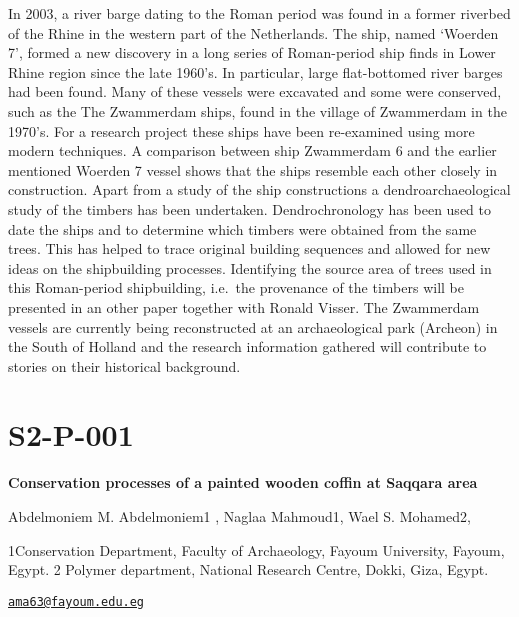 \documentclass[
]{book}
\begin{document}
In 2003, a river barge dating to the Roman period was found in a former riverbed of the Rhine in the western part of the Netherlands. The ship, named `Woerden 7', formed a new discovery in a long series of Roman-period ship finds in Lower Rhine region since the late 1960's. In particular, large flat-bottomed river barges had been found. Many of these vessels were excavated and some were conserved, such as the The Zwammerdam ships, found in the village of Zwammerdam in the 1970's. For a research project these ships have been re-examined using more modern techniques. A comparison between ship Zwammerdam 6 and the earlier mentioned Woerden 7 vessel shows that the ships resemble each other closely in construction. Apart from a study of the ship constructions a dendroarchaeological study of the timbers has been undertaken. Dendrochronology has been used to date the ships and to determine which timbers were obtained from the same trees. This has helped to trace original building sequences and allowed for new ideas on the shipbuilding processes. Identifying the source area of trees used in this Roman-period shipbuilding, i.e.~the provenance of the timbers will be presented in an other paper together with Ronald Visser. The Zwammerdam vessels are currently being reconstructed at an archaeological park (Archeon) in the South of Holland and the research information gathered will contribute to stories on their historical background.

\hypertarget{s2-p-001}{%
\section*{S2-P-001}\label{s2-p-001}}

\textbf{Conservation processes of a painted wooden coffin at Saqqara area}

Abdelmoniem M. Abdelmoniem1 , Naglaa Mahmoud1, Wael S. Mohamed2,

1Conservation Department, Faculty of Archaeology, Fayoum University, Fayoum, Egypt. 2 Polymer department, National Research Centre, Dokki, Giza, Egypt.

\href{mailto:ama63@fayoum.edu.eg}{\nolinkurl{ama63@fayoum.edu.eg}}
\end{document}
